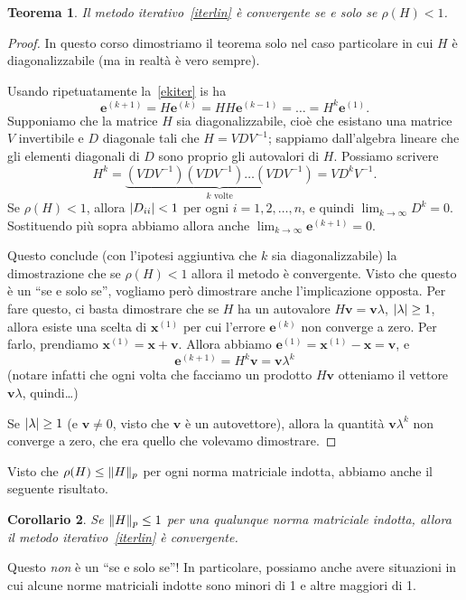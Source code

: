 \documentclass[a4paper]{report}
\DeclarePairedDelimiter{\abs}{\lvert}{\rvert}
\DeclarePairedDelimiter{\norm}{\lVert}{\rVert}
\newtheorem{theorem}{Teorema}[chapter]
\newtheorem{corollary}[theorem]{Corollario}
\theoremstyle{definiton}
\theoremstyle{remark}
\newcommand{\x}{\mathbf{x}}
\newcommand{\e}{\mathbf{e}}
\begin{document}
\begin{theorem}
Il metodo iterativo~\eqref{iterlin} è convergente se e solo se $\rho(H) < 1$.
\end{theorem}
\begin{proof}
In questo corso dimostriamo il teorema solo nel caso particolare in cui $H$ è diagonalizzabile (ma in realtà è vero sempre).

Usando ripetuatamente la~\eqref{ekiter} is ha
\[
\e^{(k+1)} = H\e^{(k)} = H H \e^{(k-1)} = \dots = H^{k} \e^{(1)}.
\]
Supponiamo che la matrice $H$ sia diagonalizzabile, cioè che esistano una matrice $V$ invertibile e $D$ diagonale tali che $H = VDV^{-1}$; sappiamo dall'algebra lineare che gli elementi diagonali di $D$ sono proprio gli autovalori di $H$. Possiamo scrivere
\[
H^k = \underbrace{(VDV^{-1})(VDV^{-1}) \dots (VDV^{-1})}_{\text{$k$ volte}} = VD^kV^{-1}.
\]
Se $\rho(H) < 1$, allora $\abs{D_{ii}} < 1$ per ogni $i=1,2,\dots,n$, e quindi $\lim_{k\to\infty} D^k = 0$. Sostituendo più sopra abbiamo allora anche $\lim_{k\to\infty} \e^{(k+1)} = 0$.

Questo conclude (con l'ipotesi aggiuntiva che $k$ sia diagonalizzabile) la dimostrazione che se $\rho(H)<1$ allora il metodo è convergente. Visto che questo è un ``se e solo se'', vogliamo però dimostrare anche l'implicazione opposta. Per fare questo, ci basta dimostrare che se $H$ ha un autovalore $H\mathbf{v} = \mathbf{v} \lambda$, $\abs{\lambda} \geq 1$, allora esiste una scelta di $\x^{(1)}$ per cui l'errore $\e^{(k)}$ non converge a zero. Per farlo, prendiamo $\x^{(1)} = \x + \mathbf{v}$. Allora abbiamo $\e^{(1)} = \x^{(1)} - \x = \mathbf{v}$, e 
\begin{equation} \label{nonconverge}
    \e^{(k+1)} = H^k \mathbf{v} = \mathbf{v} \lambda^k    
\end{equation}
(notare infatti che ogni volta che facciamo un prodotto $H\mathbf{v}$ otteniamo il vettore $\mathbf{v}\lambda$, quindi\dots)


Se $\abs{\lambda} \geq 1$ (e $\mathbf{v}\neq 0$, visto  che $\mathbf{v}$ è un autovettore), allora la quantità $\mathbf{v} \lambda^k$ non converge a zero, che era quello che volevamo dimostrare.
\end{proof}
Visto che $\rho(H) \leq \norm{H}_p$ per ogni norma matriciale indotta, abbiamo anche il seguente risultato.
\begin{corollary}
Se $\norm{H}_p \leq 1$ per una qualunque norma matriciale indotta, allora il metodo iterativo~\eqref{iterlin} è convergente.
\end{corollary}
Questo \emph{non} è un ``se e solo se''! In particolare, possiamo anche avere situazioni in cui alcune norme matriciali indotte sono minori di 1 e altre maggiori di 1.
\end{document}
